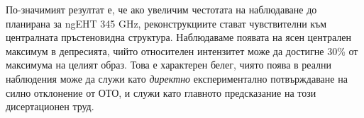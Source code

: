\documentclass[12pt]{article}
\numberwithin{equation}{section}
\numberwithin{figure}{section}
\begin{document}
	По-значимият резултат е, че ако увеличим честотата на наблюдаване до планирана за ngEHT 345 GHz, реконструкциите стават чувствителни към централната пръстеновидна структура. Наблюдаваме появата на ясен централен максимум в депресията, чийто относителен интензитет може да достигне 30\% от максимума на целият образ. Това е характерен белег, чиято поява в реални наблюдения може да служи като \emph{директно} експериментално потвърждаване на силно отклонение от ОТО, и служи като главното предсказание на този дисертационен труд.
	
	\newpage
	
	
	
\end{document}
